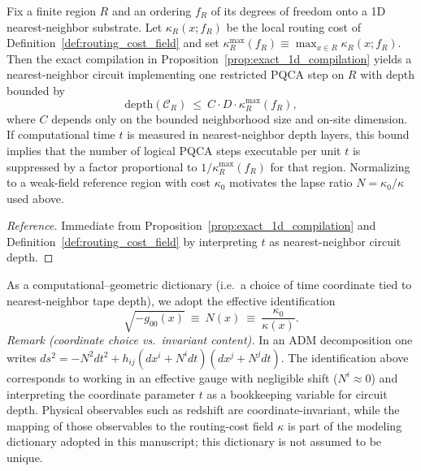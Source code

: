\begin{proposition}
\label{prop:lapse_from_depth}
Fix a finite region $R$ and an ordering $f_R$ of its degrees of freedom onto a 1D nearest-neighbor substrate. Let $\kappa_R(x;f_R)$ be the local routing cost of Definition~\ref{def:routing_cost_field} and set $\kappa_R^{\max}(f_R)\equiv \max_{x\in R}\kappa_R(x;f_R)$.
Then the exact compilation in Proposition~\ref{prop:exact_1d_compilation} yields a nearest-neighbor circuit implementing one restricted PQCA step on $R$ with depth bounded by
\begin{equation}
    \mathrm{depth}(\mathcal C_R)\ \le\ C\cdot D\cdot \kappa_R^{\max}(f_R),
\end{equation}
where $C$ depends only on the bounded neighborhood size and on-site dimension.
If computational time $t$ is measured in nearest-neighbor depth layers, this bound implies that the number of logical PQCA steps executable per unit $t$ is suppressed by a factor proportional to $1/\kappa_R^{\max}(f_R)$ for that region.
Normalizing to a weak-field reference region with cost $\kappa_0$ motivates the lapse ratio $N=\kappa_0/\kappa$ used above.
\end{proposition}
\begin{proof}[Reference]
Immediate from Proposition~\ref{prop:exact_1d_compilation} and Definition~\ref{def:routing_cost_field} by interpreting $t$ as nearest-neighbor circuit depth.
\end{proof}

As a computational--geometric dictionary (i.e.\ a choice of time coordinate tied to nearest-neighbor tape depth), we adopt the effective identification
\begin{equation}
    \sqrt{-g_{00}(x)}\ \equiv\ N(x)\ \equiv\ \frac{\kappa_0}{\kappa(x)}.
\end{equation}
\noindent
\textit{Remark (coordinate choice vs.\ invariant content).} In an ADM decomposition one writes $ds^2=-N^2dt^2+h_{ij}(dx^i+N^i dt)(dx^j+N^j dt)$. The identification above corresponds to working in an effective gauge with negligible shift ($N^i\approx 0$) and interpreting the coordinate parameter $t$ as a bookkeeping variable for circuit depth. Physical observables such as redshift are coordinate-invariant, while the mapping of those observables to the routing-cost field $\kappa$ is part of the modeling dictionary adopted in this manuscript; this dictionary is not assumed to be unique.

